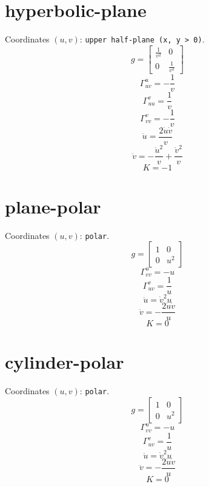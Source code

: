 \documentclass{article}
\begin{document}
\section*{hyperbolic-plane}
Coordinates $(u, v)$: \texttt{upper half-plane (x, y > 0)}.
\[ g = \left[\begin{matrix}\frac{1}{v^{2}} & 0\\0 & \frac{1}{v^{2}}\end{matrix}\right] \]
\[ \Gamma^{u}_{uv} = - \frac{1}{v} \]
\[ \Gamma^{v}_{uu} = \frac{1}{v} \]
\[ \Gamma^{v}_{vv} = - \frac{1}{v} \]
\[ \ddot{u} = \frac{2 \dot{u} \dot{v}}{v} \]
\[ \ddot{v} = - \frac{\dot{u}^{2}}{v} + \frac{\dot{v}^{2}}{v} \]
\[ K = -1 \]

\section*{plane-polar}
Coordinates $(u, v)$: \texttt{polar}.
\[ g = \left[\begin{matrix}1 & 0\\0 & u^{2}\end{matrix}\right] \]
\[ \Gamma^{u}_{vv} = - u \]
\[ \Gamma^{v}_{uv} = \frac{1}{u} \]
\[ \ddot{u} = \dot{v}^{2} u \]
\[ \ddot{v} = - \frac{2 \dot{u} \dot{v}}{u} \]
\[ K = 0 \]

\section*{cylinder-polar}
Coordinates $(u, v)$: \texttt{polar}.
\[ g = \left[\begin{matrix}1 & 0\\0 & u^{2}\end{matrix}\right] \]
\[ \Gamma^{u}_{vv} = - u \]
\[ \Gamma^{v}_{uv} = \frac{1}{u} \]
\[ \ddot{u} = \dot{v}^{2} u \]
\[ \ddot{v} = - \frac{2 \dot{u} \dot{v}}{u} \]
\[ K = 0 \]
\end{document}
